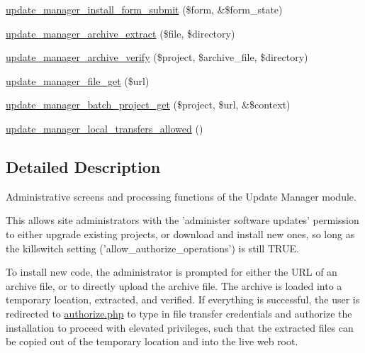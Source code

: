 \begin{DoxyCompactItemize}
\hyperlink{group__update__manager__install_ga52e9f2cddddddccf921284b01f9505b0}{update\_\-manager\_\-install\_\-form\_\-submit} (\$form, \&\$form\_\-state)
\item 
\hyperlink{group__update__manager__file_gaacbdc92035b1bb68dbb741a4917b8185}{update\_\-manager\_\-archive\_\-extract} (\$file, \$directory)
\item 
\hyperlink{group__update__manager__file_ga8c352241e56ce6de6b1064725d84801b}{update\_\-manager\_\-archive\_\-verify} (\$project, \$archive\_\-file, \$directory)
\item 
\hyperlink{group__update__manager__file_gaef701662a2b3a2bfff2c0b819860a547}{update\_\-manager\_\-file\_\-get} (\$url)
\item 
\hyperlink{group__update__manager__file_gad7fdbc7766b87956b181eb5fbec9a609}{update\_\-manager\_\-batch\_\-project\_\-get} (\$project, \$url, \&\$context)
\item 
\hyperlink{group__update__manager__file_ga88ed61885931bd3df617ca78b4fadb6c}{update\_\-manager\_\-local\_\-transfers\_\-allowed} ()
\end{DoxyCompactItemize}


\subsection{Detailed Description}
Administrative screens and processing functions of the Update Manager module.

This allows site administrators with the 'administer software updates' permission to either upgrade existing projects, or download and install new ones, so long as the killswitch setting ('allow\_\-authorize\_\-operations') is still TRUE.

To install new code, the administrator is prompted for either the URL of an archive file, or to directly upload the archive file. The archive is loaded into a temporary location, extracted, and verified. If everything is successful, the user is redirected to \hyperlink{authorize_8php}{authorize.php} to type in file transfer credentials and authorize the installation to proceed with elevated privileges, such that the extracted files can be copied out of the temporary location and into the live web root.

